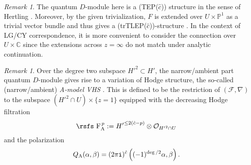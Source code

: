 \documentclass[11pt]{amsart}
\theoremstyle{definition} %
\theoremstyle{remark} %
\newtheorem{rem}[thm]{Remark}%
\newcommand{\CC}{\mathbb C}
\newcommand{\PP}{\mathbb P}
\newcommand{\marsfs}[1]{\mbox{\rsfs #1}}
\newcommand{\cO}{\mathcal{O}}
\newcommand{\cF}{\mathcal{F}}
\newcommand{\hc}{\hat{c}}
\newcommand{\iu}{\mathtt{i}}
\newcommand{\rsF}{\marsfs{F}}
\begin{document}
\begin{rem} 
The quantum $D$-module here is a  
(TEP($\hc$)) structure in the sense of 
Hertling \cite[Remark 2.13]{Hertling:ttstar}. 
Moreover, by the given trivialization, 
$F$ is extended over $U\times \PP^1$ as a 
trivial vector bundle and thus gives a (trTLEP($\hc$))-structure 
\cite[Definition 5.5]{Hertling:ttstar}. 
In the context of LG/CY correspondence, 
it is more convenient to consider the connection 
over $U\times \CC$ 
since the extensions across $z=\infty$ do not 
match under analytic continuation. 
\end{rem} 

\begin{rem} 
\label{rem:A-VHS} 
Over the degree two subspace ${H'}^2\subset H'$,  
the narrow/ambient part quantum $D$-module 
gives rise to a variation of Hodge structure, 
the so-called (narrow/ambient) \emph{A-model VHS} 
\cite[\S 6.2]{Iritani:period}. 
This is defined to be the restriction of $(\cF,\nabla)$ 
to the subspace $({H'}^2 \cap U)\times \{z=1\}$ equipped 
with the decreasing Hodge filtration 
\[
\rsF^{\, p}_{\rm A} := 
{H'}^{\le 2(\hc-p)} \otimes \cO_{{H'}^2\cap U}
\] 
and the polarization 
\[
Q_{\rm A}(\alpha,\beta) = (2\pi\iu)^{\hc} 
\left((-1)^{\deg/2} \alpha,\beta \right).
\]
\end{rem} 
\end{document}
